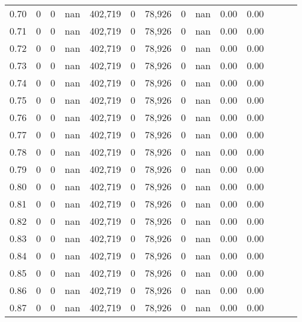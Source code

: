 \begin{tabular}{rrrrrrrrrrrrrr}
0.70 &       0 &       0 &   nan &  402,719 &        0 &  78,926 &       0 &   nan &  0.00 &      0.00 \\
0.71 &       0 &       0 &   nan &  402,719 &        0 &  78,926 &       0 &   nan &  0.00 &      0.00 \\
0.72 &       0 &       0 &   nan &  402,719 &        0 &  78,926 &       0 &   nan &  0.00 &      0.00 \\
0.73 &       0 &       0 &   nan &  402,719 &        0 &  78,926 &       0 &   nan &  0.00 &      0.00 \\
0.74 &       0 &       0 &   nan &  402,719 &        0 &  78,926 &       0 &   nan &  0.00 &      0.00 \\
0.75 &       0 &       0 &   nan &  402,719 &        0 &  78,926 &       0 &   nan &  0.00 &      0.00 \\
0.76 &       0 &       0 &   nan &  402,719 &        0 &  78,926 &       0 &   nan &  0.00 &      0.00 \\
0.77 &       0 &       0 &   nan &  402,719 &        0 &  78,926 &       0 &   nan &  0.00 &      0.00 \\
0.78 &       0 &       0 &   nan &  402,719 &        0 &  78,926 &       0 &   nan &  0.00 &      0.00 \\
0.79 &       0 &       0 &   nan &  402,719 &        0 &  78,926 &       0 &   nan &  0.00 &      0.00 \\
0.80 &       0 &       0 &   nan &  402,719 &        0 &  78,926 &       0 &   nan &  0.00 &      0.00 \\
0.81 &       0 &       0 &   nan &  402,719 &        0 &  78,926 &       0 &   nan &  0.00 &      0.00 \\
0.82 &       0 &       0 &   nan &  402,719 &        0 &  78,926 &       0 &   nan &  0.00 &      0.00 \\
0.83 &       0 &       0 &   nan &  402,719 &        0 &  78,926 &       0 &   nan &  0.00 &      0.00 \\
0.84 &       0 &       0 &   nan &  402,719 &        0 &  78,926 &       0 &   nan &  0.00 &      0.00 \\
0.85 &       0 &       0 &   nan &  402,719 &        0 &  78,926 &       0 &   nan &  0.00 &      0.00 \\
0.86 &       0 &       0 &   nan &  402,719 &        0 &  78,926 &       0 &   nan &  0.00 &      0.00 \\
0.87 &       0 &       0 &   nan &  402,719 &        0 &  78,926 &       0 &   nan &  0.00 &      0.00 \\

\end{tabular}
